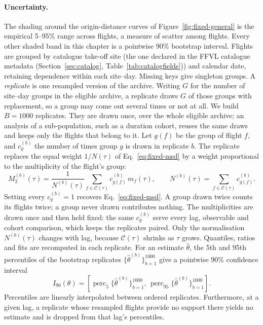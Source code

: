 \paragraph{Uncertainty.}\label{par:fixed-uncertainty} The shading around the origin-distance curves of
Figure~\ref{fig:fixed-general} is the empirical 5--95\% range across flights, a
measure of scatter among flights. Every other shaded band in this chapter is a
pointwise 90\% bootstrap interval. Flights are grouped by
catalogue take-off site (the one declared in the FFVL catalogue metadata
(Section~\ref{sec:catalog}, Table~\ref{tab:catalogfields})) and calendar date, retaining dependence within each site--day.
Missing keys give singleton groups.
A \emph{replicate} is one resampled version of the archive. Writing $G$ for the number of
site--day groups in the eligible archive, a replicate draws $G$ of those groups with
replacement, so a group may come out several times or not at all. We build $B=1000$
replicates. They are drawn once, over the whole eligible archive; an analysis of a
sub-population, such as a duration cohort, reuses the same draws and keeps only the
flights that belong to it.
Let $g(f)$ be the group of flight $f$, and $c^{(b)}_g$ the number of times group $g$ is
drawn in replicate $b$. The replicate replaces the equal weight $1/N(\tau)$ of
Eq.~\eqref{eq:fixed-msd} by a weight proportional to the multiplicity of the flight's
group:
\begin{equation}
 M_2^{(b)}(\tau)=\frac{1}{N^{(b)}(\tau)}
 \sum_{f\in\mathcal C(\tau)}c^{(b)}_{g(f)}\,m_f(\tau),
 \qquad
 N^{(b)}(\tau)=\sum_{f\in\mathcal C(\tau)}c^{(b)}_{g(f)}.
 \label{eq:fixed-bootstrap}
\end{equation}
Setting every $c^{(b)}_g=1$ recovers Eq.~\eqref{eq:fixed-msd}. A group drawn twice
counts its flights twice; a group never drawn contributes nothing.
The multiplicities are drawn once and then held fixed: the same $c^{(b)}_g$ serve every
lag, observable and cohort comparison, which keeps the replicates paired. Only the
normalisation $N^{(b)}(\tau)$ changes with lag, because $\mathcal C(\tau)$ shrinks as
$\tau$ grows. Quantiles, ratios and fits are recomputed in each replicate. For an estimate $\widehat\theta$,
the 5th and 95th percentiles of the bootstrap replicates $\{\widehat\theta^{(b)}\}_{b=1}^{1000}$ give a pointwise 90\% confidence interval
\begin{equation}
 I_{90}(\theta)=
 \left[\operatorname{perc}_{5}\{\widehat\theta^{(b)}\}_{b=1}^{1000},\,
       \operatorname{perc}_{95}\{\widehat\theta^{(b)}\}_{b=1}^{1000}\right].
 \label{eq:fixed-ci}
\end{equation}
Percentiles are linearly interpolated between ordered replicates.
Furthermore, at a given lag, a replicate whose resampled flights provide no support there
yields no estimate and is dropped from that lag's percentiles.

